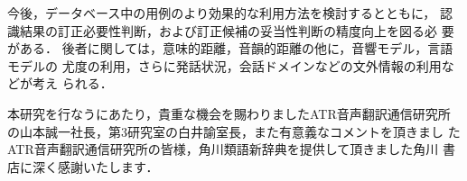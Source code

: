 今後，データベース中の用例のより効果的な利用方法を検討するとともに，
認識結果の訂正必要性判断，および訂正候補の妥当性判断の精度向上を図る必
要がある．
後者に関しては，意味的距離，音韻的距離の他に，音響モデル，言語モデルの
尤度の利用，さらに発話状況，会話ドメインなどの文外情報の利用などが考え
られる．

\acknowledgment

本研究を行なうにあたり，貴重な機会を賜わりましたATR音声翻訳通信研究所
の山本誠一社長，第3研究室の白井諭室長，また有意義なコメントを頂きまし
たATR音声翻訳通信研究所の皆様，角川類語新辞典を提供して頂きました角川
書店に深く感謝いたします．





\begin{biography}


\end{biography}


